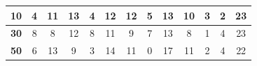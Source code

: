 \documentclass[12pt,a4paper]{report}
\begin{document}
{{{{{{{\begin{table}[h]
\begin{tabular}{|c|c|c|c|c|c|c|c|c|c|c|c|c|}
{\bf 10} & 4             & 11            & 13            & 4             & 12             & 12             & 5              & 13              & 10            & 3         & 2         & 23        \\ \hline
{\bf 30} & 8             & 8            & 12            & 8             & 11             & 9             & 7              & 13              & 8             & 1         & 4         & 23        \\ \hline
{\bf 50} & 6             & 13            & 9            & 3             & 14             & 11             & 0              & 17              & 11             & 2         & 4         &  22        \\ \hline
\end{tabular}
\end{table}

}}}}}}}
\end{document}
